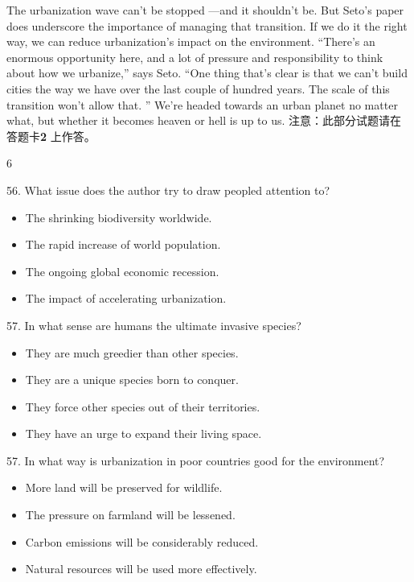\documentclass[UTF8,11pt]{ctexart}
\begin{document}
The urbanization wave can’t be stopped —and it shouldn’t be. But Seto’s paper does underscore the importance of managing that transition. If we do it the right way, we can reduce urbanization’s impact on the environment. “There’s an enormous opportunity here, and a lot of pressure and responsibility to think about how we urbanize,” says Seto. “One thing that’s clear is that we can’t build cities the way we have over the last couple of hundred years. The scale of this transition won’t allow that. ” We’re headed towards an urban planet no matter what, but whether it becomes heaven or hell is up to us. 注意：此部分试题请在答题卡\textbf{2} 上作答。


6


56. What issue does the author try to draw peopled attention to?


\begin{itemize}[leftmargin=2em,itemsep=.2em,topsep=.4em]\item[A.] The shrinking biodiversity worldwide.
\item[B.] The rapid increase of world population.
\item[C.] The ongoing global economic recession.
\item[D.] The impact of accelerating urbanization.
\end{itemize}

57. In what sense are humans the ultimate invasive species?


\begin{itemize}[leftmargin=2em,itemsep=.2em,topsep=.4em]\item[A.] They are much greedier than other species.
\item[B.] They are a unique species born to conquer.
\item[C.] They force other species out of their territories.
\item[D.] They have an urge to expand their living space.
\end{itemize}

57. In what way is urbanization in poor countries good for the environment?


\begin{itemize}[leftmargin=2em,itemsep=.2em,topsep=.4em]\item[A.] More land will be preserved for wildlife.
\item[B.] The pressure on farmland will be lessened.
\item[C.] Carbon emissions will be considerably reduced.
\item[D.] Natural resources will be used more effectively.
\end{itemize}
\end{document}
